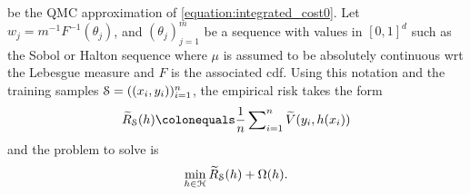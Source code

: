be the \ac{QMC} approximation of \cref{equation:integrated_cost0}. Let $w_j =
m^{-1}F^{-1}(\theta_j)$, and $(\theta_j)_{j=1}^m$ be a sequence with values in
$[0, 1]^d$ such as the Sobol or Halton sequence where $\mu$ is assumed to be
absolutely continuous \acs{wrt} the Lebesgue measure and $F$ is the associated
cdf.  Using this notation and the training samples
$\mathcal{S}=((x_i,y_i))_{i=1}^n$, the empirical risk takes the form
\begin{align}
    \sampledempiricalrisk(h) \defeq \frac{1}{n} \sum\nolimits_{i=1}^n
    \widetilde{\cost}(y_i, h(x_i))
\end{align}
and the problem to solve is
\begin{align}\label{equation:h-objective-empir2}
    \min_{h\in \mathcal{H}} \widetilde{{R}}_{\mathcal{S}}(h) + \Omega(h).
\end{align}
%
